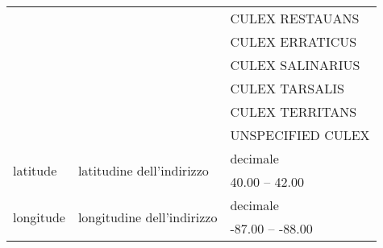 \begin{longtable}{lll}
	& & CULEX RESTAUANS \\
	& & CULEX ERRATICUS \\
	& & CULEX SALINARIUS \\
	& & CULEX TARSALIS \\
	& & CULEX TERRITANS \\
	& & UNSPECIFIED CULEX  \\	\hline
	\multirow{2}{*}{latitude}				& \multirow{2}{*}{latitudine dell'indirizzo}	 &  decimale       \\ 
	& & {40.00} -- {42.00}  \\ \hline
	\multirow{2}{*}{longitude}				& \multirow{2}{*}{longitudine dell'indirizzo} &  decimale      	\\ 
	&& {-87.00} -- {-88.00} \\
	\bottomrule
\end{longtable}
\label{tab:attributi wnv}

